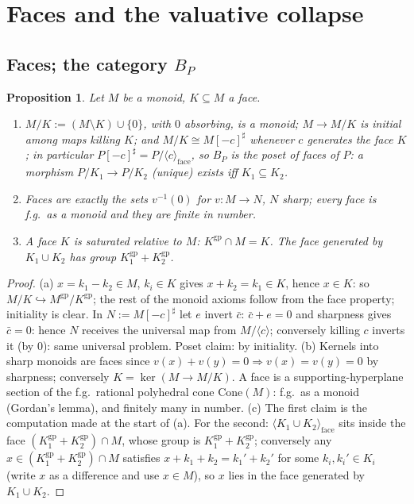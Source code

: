 \documentclass[11pt]{article}
\newtheorem{proposition}[theorem]{Proposition}
\theoremstyle{definition}
\newcommand{\gp}{\mathrm{gp}}
\newcommand{\Cone}{\mathrm{Cone}}
\begin{document}
\section{Faces and the valuative collapse}\label{sec:collapse}

\subsection{Faces; the category $B_P$}

\begin{proposition}\label{prop:bp}
Let $M$ be a monoid, $K\subseteq M$ a face.
\begin{enumerate}[label=\textup{(\alph*)},leftmargin=1.8em]
\item $M/K:=(M\setminus K)\cup\{0\}$, with $0$ absorbing, is a monoid;
$M\to M/K$ is initial among maps killing $K$; and
$M/K\cong M[-c]^{\sharp}$ whenever $c$ generates the face $K$; in
particular $P[-c]^{\sharp}=P/\langle c\rangle_{\mathrm{face}}$, so
$B_P$ is the poset of faces of $P$: a morphism $P/K_1\to P/K_2$
\textup{(}unique\textup{)} exists iff $K_1\subseteq K_2$.
\item Faces are exactly the sets $v^{-1}(0)$ for $v:M\to N$, $N$
sharp; every face is f.g.\ as a monoid and they are finite in number.
\item A face $K$ is saturated relative to $M$: $K^{\gp}\cap M=K$. The
face generated by $K_1\cup K_2$ has group $K_1^{\gp}+K_2^{\gp}$.
\end{enumerate}
\end{proposition}

\begin{proof}
(a) $x=k_1-k_2\in M$, $k_i\in K$ gives $x+k_2=k_1\in K$, hence
$x\in K$: so $M/K\hookrightarrow M^{\gp}/K^{\gp}$; the rest of the
monoid axioms follow from the face property; initiality is clear.
In $N:=M[-c]^{\sharp}$ let $e$ invert $\bar c$: $\bar c+e=0$ and
sharpness gives $\bar c=0$: hence $N$ receives the universal map from
$M/\langle c\rangle$; conversely killing $c$ inverts it (by $0$): same
universal problem. Poset claim: by initiality.
(b) Kernels into sharp monoids are faces since $v(x)+v(y)=0\Rightarrow
v(x)=v(y)=0$ by sharpness; conversely $K=\ker(M\to M/K)$. A face is a
supporting-hyperplane section of the f.g.\ rational polyhedral cone
$\Cone(M)$: f.g.\ as a monoid (Gordan's lemma), and finitely many in
number.
(c) The first claim is the computation made at the start of (a).
For the second: $\langle K_1\cup K_2\rangle_{\mathrm{face}}$ sits
inside the face $(K_1^{\gp}+K_2^{\gp})\cap M$, whose group is
$K_1^{\gp}+K_2^{\gp}$; conversely any $x\in(K_1^{\gp}+K_2^{\gp})\cap
M$ satisfies $x+k_1+k_2=k_1'+k_2'$ for some $k_i,k_i'\in K_i$ (write
$x$ as a difference and use $x\in M$), so $x$ lies in the face
generated by $K_1\cup K_2$.
\end{proof}
\end{document}
